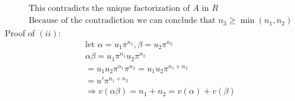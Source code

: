 \documentclass[11pt]{article}
\begin{document}
{\begin{align*}
&\text{This contradicts the unique factorization of $A$ in $R$}\\
&\text{Because of the contradiction we can conclude that $n_3 \geq \min (n_1, n_2)$}
\end{align*}
Proof of $(ii)$:
\begin{align*}
&\text{let } \alpha = u_1 \pi ^ {n_1}, \beta = u_2 \pi ^{n_2}\\
&\alpha \beta = u_1 \pi ^ {n_1} u_2 \pi ^{n_2}\\
&= u_1 u_2 \pi ^ {n_1} \pi ^{n_2} = u_1 u_2 \pi ^ {n_1+n_2}\\
& = u' \pi ^ {n_1+n_2}\\
&\Rightarrow v(\alpha \beta) = n_1 + n_2 = v(\alpha ) + v(\beta)\\
\end{align*}
}
\end{document}
